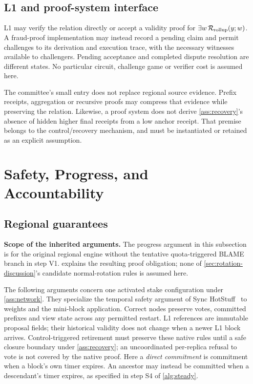 \documentclass[11pt,a4paper,onecolumn]{article}
\begin{document}
\subsection{L1 and proof-system interface}
L1 may verify the relation directly or accept a validity proof for
$\exists w\,\mathcal R_{\rm rollup}(y;w)$. A fraud-proof implementation may
instead record a pending claim and permit challenges to its derivation and
execution trace, with the necessary witnesses available to challengers.
Pending acceptance and completed dispute resolution are different states.
No particular circuit, challenge game or verifier cost is assumed here.

The committee's small entry does not replace regional source evidence.
Prefix receipts, aggregation or recursive proofs may compress that evidence
while preserving the relation. Likewise, a proof system does not derive
\cref{ass:recovery}'s absence of hidden higher final receipts from a low
anchor receipt. That premise belongs to the control/recovery mechanism,
and must be instantiated or retained as an explicit assumption.

\section{Safety, Progress, and Accountability}\label{sec:security}
\subsection{Regional guarantees}
\noindent\textbf{Scope of the inherited arguments.}
The progress argument in this subsection is for the original regional engine
without the tentative quota-triggered BLAME branch in step V1.
 explains the resulting proof obligation; none of
\cref{sec:rotation-discussion}'s candidate normal-rotation rules is assumed here.

The following arguments concern one activated stake configuration under
\cref{ass:network}. They specialize the temporal safety argument of
Sync HotStuff~\cite{synchotstuff} to weights and the mini-block application.
Correct nodes preserve votes, committed prefixes and view state across any
permitted restart. L1 references are immutable proposal fields; their
historical validity does not change when a newer L1 block arrives.
Control-triggered retirement must preserve these native rules until a
safe closure boundary under \cref{ass:recovery}; an uncoordinated
per-replica refusal to vote is not covered by the native proof.
Here a \emph{direct commitment} is commitment when a block's own timer
expires. An ancestor may instead be committed when a descendant's timer
expires, as specified in step S4 of \cref{alg:steady}.
\end{document}
